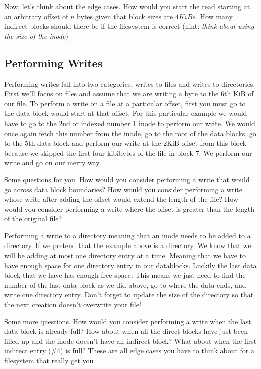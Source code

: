 Now, let's think about the edge cases.
How would you start the read starting at an arbitrary offset of $n$ bytes given that block sizes are $4 KiBs$.
How many indirect blocks should there be if the filesystem is correct (hint: \textit{think about using the size of the inode})

\subsection{Performing Writes}

Performing writes fall into two categories, writes to files and writes to directories.
First we'll focus on files and assume that we are writing a byte to the $6$th KiB of our file.
To perform a write on a file at a particular offset, first you must go to the data block would start at that offset.
For this particular example we would have to go to the 2nd or indexed number 1 inode to perform our write.
We would once again fetch this number from the inode, go to the root of the data blocks, go to the $5$th data block and perform our write at the $2$KiB offset from this block because we skipped the first four kibibytes of the file in block 7.
We perform our write and go on our merry way

Some questions for you. How would you consider performing a write that would go across data block boundaries? How would you consider performing a write whose write after adding the offset would extend the length of the file?  How would you consider performing a write where the offset is greater than the length of the original file?

Performing a write to a directory meaning that an inode needs to be added to a directory.
If we pretend that the example above is a directory.
We know that we will be adding at most one directory entry at a time.
Meaning that we have to have enough space for one directory entry in our datablocks.
Luckily the last data block that we have has enough free space.
This means we just need to find the number of the last data block as we did above, go to where the data ends, and write one directory entry.
Don't forget to update the size of the directory so that the next creation doesn't overwrite your file!

Some more questions. How would you consider performing a write when the last data block is already full? How about when all the direct blocks have just been filled up and the inode doesn't have an indirect block? What about when the first indirect entry (\#4) is full?
These are all edge cases you have to think about for a filesystem that really get you

